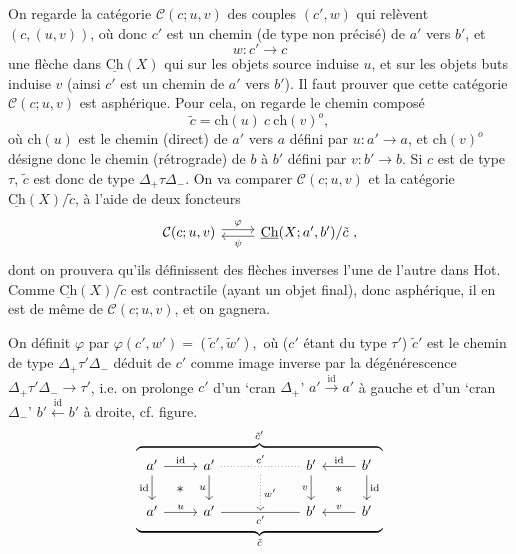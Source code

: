 \documentclass[11pt]{article}
\newcommand{\printedpage}[1]{\marginpar{\footnotesize p.~#1}}
\newcommand{\msp}[1]{\marginpar{\footnotesize [#1]}}
\newcommand{\Ch}{\underline{\mathrm{Ch}}}
\newcommand{\cC}{\mathcal{C}}
\begin{document}
On regarde la catégorie $\cC(c;u,v)$ des couples $(c',w)$ qui relèvent $(c,(u,v))$, où donc $c'$ est un chemin (de type non précisé) de $a'$ vers $b'$, et
\[
w : c' \longrightarrow c
\]
une flèche dans $\Ch(X)$ qui sur les objets source induise $u$, et sur les objets buts induise $v$ (ainsi $c'$ est un chemin de $a'$ vers $b'$). Il faut
\printedpage{101}
\msp{page 162}
prouver que cette catégorie $\cC(c;u,v)$ est asphérique. Pour cela, on regarde le chemin composé
\[
\tilde{c} = \mathrm{ch}(u)\ c\ \mathrm{ch}(v)^{o},
\]
où $\mathrm{ch}(u)$ est le chemin (direct) de $a'$ vers $a$ défini par $u : a' \longrightarrow a$, et $\mathrm{ch}(v)^{o}$ désigne donc le chemin (rétrograde) de $b$ à $b'$ défini par $v : b' \longrightarrow b$. Si $c$ est de type $\tau$, $\tilde{c}$ est donc de type $\Delta_{+}\tau\Delta_{-}$. On va comparer $\cC(c;u,v)$ et la catégorie $\Ch(X)/\tilde{c}$, à l'aide de deux foncteurs
\[
\begin{tikzcd}
\cC(c;u,v) \ar[r,shift left,"\varphi"] & \Ch(X;a',b')/\tilde{c}\ , \ar[l,shift left,"\psi"]
\end{tikzcd}
\]
dont on prouvera qu'ils définissent des flèches inverses l'une de l'autre dans Hot. Comme $\Ch(X)/\tilde{c}$ est contractile (ayant un objet final), donc asphérique, il en est de même de $\cC(c;u,v)$, et on gagnera.

On définit $\varphi$ par $\boxed{\varphi(c',w') = (\tilde{c}',\tilde{w}'),}$ où ($c'$ étant du type $\tau'$) $\tilde{c}'$ est le chemin de type $\Delta_{+}\tau'\Delta_{-}$ déduit de $c'$ comme image inverse par la dégénérescence $\Delta_{+}\tau'\Delta_{-} \longrightarrow \tau'$, i.e. on prolonge $c'$ d'un `cran $\Delta_{+}$' $a' \xrightarrow{\mathrm{id}} a'$ à gauche et d'un `cran $\Delta_{-}$' $b' \xleftarrow{\mathrm{id}} b'$ à droite, cf. figure.
\[
\overbrace{\underbrace{\begin{tikzcd}[ampersand replacement=\&]
a' \ar[r,"\mathrm{id}"] \ar[d,"\mathrm{id}"'] \ar[dr,phantom,"\ast"] \& a' \ar[rr,dotted,no head,"c'"] \ar[d,"u"'] \& {} \ar[d,dotted,"w'"] \& b' \ar[d,"v"'] \ar[dr,phantom,"\ast"] \& b' \ar[l,"\mathrm{id}"'] \ar[d,"\mathrm{id}"] \\
a' \ar[r,"u"] \& a' \ar[rr,no head,"c'"'] \& {} \& b' \& b' \ar[l,"v"'] %
\end{tikzcd}}_{\tilde{c}}}^{\tilde{c}'}
\]
\end{document}
